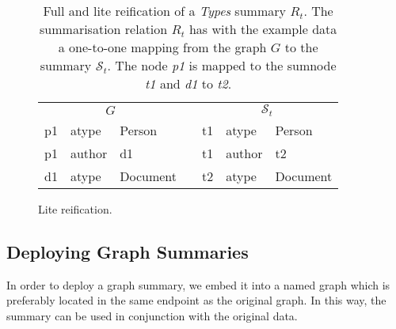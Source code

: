 \begin{table}
\begin{subfigure}{.475\textwidth}
{\begin{tabular}{lllc@{\s}lll}
				\toprule
				\multicolumn{3}{c}{$G$} & \phantom{a} & \multicolumn{3}{c}{$\mathcal{S}_t$} \\
				\cmidrule{1-3} \cmidrule{5-7}
				p1 & \gls{atype} & Person & \phantom{a} & t1 & \gls{atype} & Person \\
				p1 & author & d1 & \phantom{a} & t1 & author & t2 \\
				d1 & \gls{atype} & Document & \phantom{a} & t2 & \gls{atype} & Document \\
				\bottomrule
			\end{tabular}
		}
		\caption{Lite reification.}
		\label{tab:reification-edge-case-lite}
	\end{subfigure}
	\caption{Full and lite reification of a \emph{Types} summary $R_t$. The summarisation relation $R_t$ has with the example data a one-to-one mapping from the graph $G$ to the summary $\mathcal{S}_t$. The node \emph{p1} is mapped to the sumnode \emph{t1} and \emph{d1} to \emph{t2}.}
	\label{tab:reification-edge-case}
\end{table}

\subsection{Deploying Graph Summaries}
\label{chap03:summary-deploy}

In order to deploy a graph summary, we embed it into a named graph which is preferably located in the same endpoint as the original graph. In this way, the summary can be used in conjunction with the original data.
